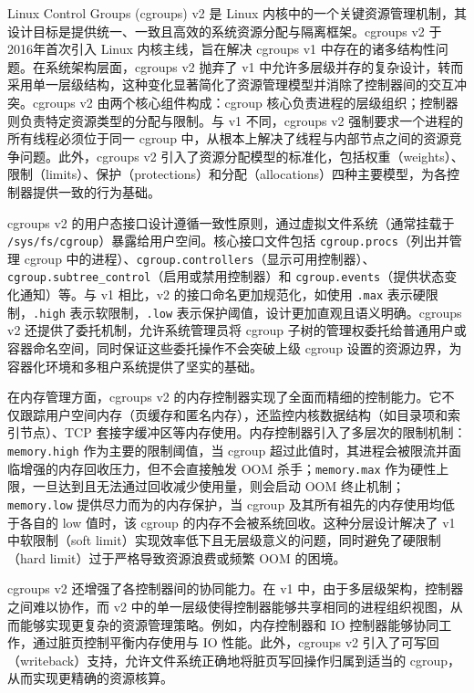 Linux Control Groups (cgroups) v2 是 Linux 内核中的一个关键资源管理机制，其设计目标是提供统一、一致且高效的系统资源分配与隔离框架。cgroups v2 于2016年首次引入 Linux 内核主线，旨在解决 cgroups v1 中存在的诸多结构性问题。在系统架构层面，cgroups v2 抛弃了 v1 中允许多层级并存的复杂设计，转而采用单一层级结构，这种变化显著简化了资源管理模型并消除了控制器间的交互冲突。cgroups v2 由两个核心组件构成：cgroup 核心负责进程的层级组织；控制器则负责特定资源类型的分配与限制。与 v1 不同，cgroups v2 强制要求一个进程的所有线程必须位于同一 cgroup 中，从根本上解决了线程与内部节点之间的资源竞争问题。此外，cgroups v2 引入了资源分配模型的标准化，包括权重（weights）、限制（limits）、保护（protections）和分配（allocations）四种主要模型，为各控制器提供一致的行为基础。

cgroups v2 的用户态接口设计遵循一致性原则，通过虚拟文件系统（通常挂载于 \texttt{/sys/fs/cgroup}）暴露给用户空间。核心接口文件包括 \texttt{cgroup.procs}（列出并管理 cgroup 中的进程）、\texttt{cgroup.controllers}（显示可用控制器）、\texttt{cgroup.subtree\_control}（启用或禁用控制器）和 \texttt{cgroup.events}（提供状态变化通知）等。与 v1 相比，v2 的接口命名更加规范化，如使用 \texttt{.max} 表示硬限制，\texttt{.high} 表示软限制，\texttt{.low} 表示保护阈值，设计更加直观且语义明确。cgroups v2 还提供了委托机制，允许系统管理员将 cgroup 子树的管理权委托给普通用户或容器命名空间，同时保证这些委托操作不会突破上级 cgroup 设置的资源边界，为容器化环境和多租户系统提供了坚实的基础。

在内存管理方面，cgroups v2 的内存控制器实现了全面而精细的控制能力。它不仅跟踪用户空间内存（页缓存和匿名内存），还监控内核数据结构（如目录项和索引节点）、TCP 套接字缓冲区等内存使用。内存控制器引入了多层次的限制机制：\texttt{memory.high} 作为主要的限制阈值，当 cgroup 超过此值时，其进程会被限流并面临增强的内存回收压力，但不会直接触发 OOM 杀手；\texttt{memory.max} 作为硬性上限，一旦达到且无法通过回收减少使用量，则会启动 OOM 终止机制；\texttt{memory.low} 提供尽力而为的内存保护，当 cgroup 及其所有祖先的内存使用均低于各自的 low 值时，该 cgroup 的内存不会被系统回收。这种分层设计解决了 v1 中软限制（soft limit）实现效率低下且无层级意义的问题，同时避免了硬限制（hard limit）过于严格导致资源浪费或频繁 OOM 的困境。

cgroups v2 还增强了各控制器间的协同能力。在 v1 中，由于多层级架构，控制器之间难以协作，而 v2 中的单一层级使得控制器能够共享相同的进程组织视图，从而能够实现更复杂的资源管理策略。例如，内存控制器和 IO 控制器能够协同工作，通过脏页控制平衡内存使用与 IO 性能。此外，cgroups v2 引入了可写回（writeback）支持，允许文件系统正确地将脏页写回操作归属到适当的 cgroup，从而实现更精确的资源核算。

